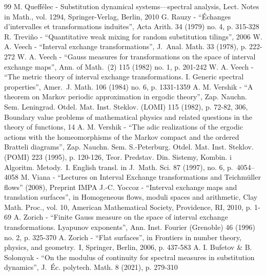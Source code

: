 \begin{thebibliography}{99}
 M. Queffélec - Substitution dynamical systems—spectral analysis, Lect. Notes in Math., vol. 1294, Springer-Verlag, Berlin, 2010
 G. Rauzy - “Échanges d’intervalles et transformations induites”, Acta Arith. 34 (1979) no. 4, p. 315-328
 R. Treviño - “Quantitative weak mixing for random substitution tilings”, 2006
 W. A. Veech - “Interval exchange transformations”, J. Anal. Math. 33 (1978), p. 222-272
 W. A. Veech - “Gauss measures for transformations on the space of interval exchange maps”, Ann. of Math. (2) 115 (1982) no. 1, p. 201-242
 W. A. Veech - “The metric theory of interval exchange transformations. I. Generic spectral properties”, Amer. J. Math. 106 (1984) no. 6, p. 1331-1359
 A. M. Vershik - “A theorem on Markov periodic approximation in ergodic theory”, Zap. Nauchn. Sem. Leningrad. Otdel. Mat. Inst. Steklov. (LOMI) 115 (1982), p. 72-82, 306, Boundary value problems of mathematical physics and related questions in the theory of functions, 14
 A. M. Vershik - “The adic realizations of the ergodic actions with the homeomorphisms of the Markov compact and the ordered Bratteli diagrams”, Zap. Nauchn. Sem. S.-Peterburg. Otdel. Mat. Inst. Steklov. (POMI) 223 (1995), p. 120-126, Teor. Predstav. Din. Sistemy, Kombin. i Algoritm. Metody. I. English transl. in J. Math. Sci. 87 (1997), no. 6, p. 4054–4058
 M. Viana - “Lectures on Interval Exchange transformations and Teichmüller flows” (2008), Preprint IMPA
 J.-C. Yoccoz - “Interval exchange maps and translation surfaces”, in Homogeneous flows, moduli spaces and arithmetic, Clay Math. Proc., vol. 10, American Mathematical Society, Providence, RI, 2010, p. 1-69
 A. Zorich - “Finite Gauss measure on the space of interval exchange transformations. Lyapunov exponents”, Ann. Inst. Fourier (Grenoble) 46 (1996) no. 2, p. 325-370
 A. Zorich - “Flat surfaces”, in Frontiers in number theory, physics, and geometry. I, Springer, Berlin, 2006, p. 437-583
 A. I. Bufetov \& B. Solomyak - “On the modulus of continuity for spectral measures in substitution dynamics”, J. Éc. polytech. Math. 8 (2021), p. 279-310
\end{thebibliography}
